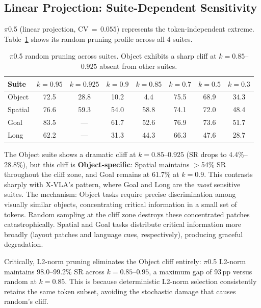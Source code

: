 \documentclass[10pt,twocolumn]{article}
\begin{document}
\subsection{Linear Projection: Suite-Dependent Sensitivity}
\label{sec:linear}

$\pi$0.5 (linear projection, CV$\,=\,0.055$) represents the token-independent extreme.
Table~\ref{tab:pi05_random} shows its random pruning profile across all 4 suites.

\begin{table}[t]
\centering
\caption{$\pi$0.5 random pruning across suites. Object exhibits a sharp cliff at $k\!=\!0.85$--$0.925$ absent from other suites.}
\label{tab:pi05_random}
\small
\begin{tabular}{@{}lccccccc@{}}
\toprule
Suite & $k\!=\!0.95$ & $k\!=\!0.925$ & $k\!=\!0.9$ & $k\!=\!0.85$ & $k\!=\!0.7$ & $k\!=\!0.5$ & $k\!=\!0.3$ \\
\midrule
Object & 72.5 & 28.8 & 10.2 & 4.4 & 75.5 & 68.9 & 34.3 \\
Spatial & 76.6 & 59.3 & 54.0 & 58.8 & 74.1 & 72.0 & 48.4 \\
Goal & 83.5 & --- & 61.7 & 52.6 & 76.9 & 73.6 & 51.7 \\
Long & 62.2 & --- & 31.3 & 44.3 & 66.3 & 47.6 & 28.7 \\
\bottomrule
\end{tabular}
\end{table}

The Object suite shows a dramatic cliff at $k\!=\!0.85$--$0.925$ (SR drops to 4.4\%--28.8\%), but this cliff is \textbf{Object-specific}: Spatial maintains $>$54\% SR throughout the cliff zone, and Goal remains at 61.7\% at $k\!=\!0.9$.
This contrasts sharply with X-VLA's pattern, where Goal and Long are the \emph{most} sensitive suites.
The mechanism: Object tasks require precise discrimination among visually similar objects, concentrating critical information in a small set of tokens.
Random sampling at the cliff zone destroys these concentrated patches catastrophically.
Spatial and Goal tasks distribute critical information more broadly (layout patches and language cues, respectively), producing graceful degradation.

Critically, L2-norm pruning eliminates the Object cliff entirely: $\pi$0.5 L2-norm maintains 98.0--99.2\% SR across $k\!=\!0.85$--$0.95$, a maximum gap of 93\,pp versus random at $k\!=\!0.85$.
This is because deterministic L2-norm selection consistently retains the same token subset, avoiding the stochastic damage that causes random's cliff.
\end{document}
